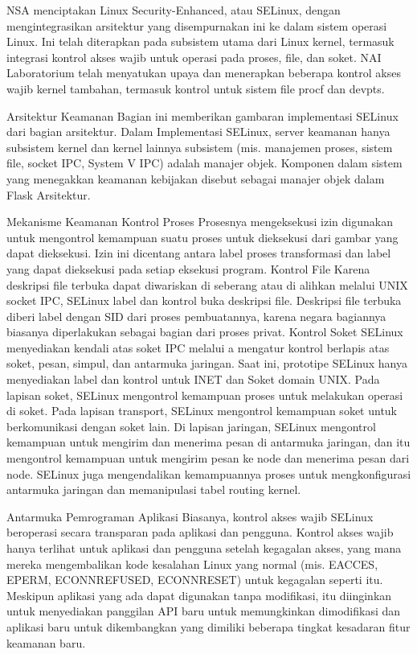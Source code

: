 \begin{enumeratae}
NSA menciptakan Linux Security-Enhanced, atau SELinux, dengan mengintegrasikan arsitektur yang disempurnakan ini ke dalam sistem operasi Linux. Ini telah diterapkan pada subsistem utama dari Linux kernel, termasuk integrasi kontrol akses wajib untuk operasi pada proses, file, dan soket. NAI Laboratorium telah menyatukan upaya dan menerapkan beberapa kontrol akses wajib kernel tambahan, termasuk kontrol untuk sistem file procf dan devpts.

Arsitektur Keamanan
Bagian ini memberikan gambaran implementasi SELinux dari bagian arsitektur. Dalam Implementasi SELinux, server keamanan hanya subsistem kernel dan kernel lainnya subsistem (mis. manajemen proses, sistem file, socket IPC, System V IPC) adalah manajer objek. Komponen dalam sistem yang menegakkan keamanan kebijakan disebut sebagai manajer objek dalam Flask Arsitektur.


Mekanisme Keamanan
Kontrol Proses
Prosesnya mengeksekusi izin digunakan untuk mengontrol kemampuan suatu proses untuk dieksekusi dari gambar yang dapat dieksekusi. Izin ini dicentang antara label proses transformasi dan label yang dapat dieksekusi pada setiap eksekusi program.
Kontrol File
Karena deskripsi file terbuka dapat diwariskan di seberang atau di alihkan melalui UNIX socket IPC, SELinux label dan kontrol buka deskripsi file. Deskripsi file terbuka diberi label dengan SID dari proses pembuatannya, karena negara bagiannya biasanya diperlakukan sebagai bagian dari proses privat.
Kontrol Soket
SELinux menyediakan kendali atas soket IPC melalui a mengatur kontrol berlapis atas soket, pesan, simpul, dan antarmuka jaringan. Saat ini, prototipe SELinux hanya menyediakan label dan kontrol untuk INET dan Soket domain UNIX. Pada lapisan soket, SELinux mengontrol kemampuan proses untuk melakukan operasi di soket. Pada lapisan transport, SELinux mengontrol kemampuan soket untuk berkomunikasi dengan soket lain. Di lapisan jaringan, SELinux mengontrol kemampuan untuk mengirim dan menerima pesan di antarmuka jaringan, dan itu mengontrol kemampuan untuk mengirim pesan ke node dan menerima pesan dari node. SELinux juga mengendalikan kemampuannya proses untuk mengkonfigurasi antarmuka jaringan dan memanipulasi tabel routing kernel.

Antarmuka Pemrograman Aplikasi
Biasanya, kontrol akses wajib SELinux beroperasi secara transparan pada aplikasi dan pengguna. Kontrol akses wajib hanya terlihat untuk aplikasi dan pengguna setelah kegagalan akses, yang mana mereka mengembalikan kode kesalahan Linux yang normal (mis. EACCES, EPERM, ECONNREFUSED, ECONNRESET) untuk kegagalan seperti itu.
Meskipun aplikasi yang ada dapat digunakan tanpa modifikasi, itu diinginkan untuk menyediakan panggilan API baru untuk memungkinkan dimodifikasi dan aplikasi baru untuk dikembangkan yang dimiliki beberapa tingkat kesadaran fitur keamanan baru.



\end{enumeratae}

